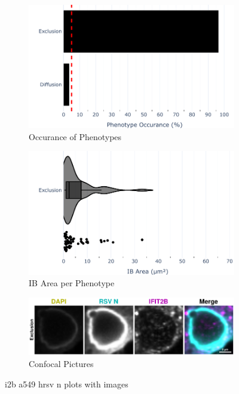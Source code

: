 \begin{figure}
    \begin{subfigure}{0.5\textwidth}
        \includegraphics[width=1\linewidth]{10. Chapter 5/Figs/01. Infection/02. IFIT2B/01. bar_i2b_a549-n.pdf} 
        \caption[]{Occurance of Phenotypes}
    \end{subfigure}
    \begin{subfigure}{0.5\textwidth}
        \includegraphics[width=1\linewidth]{10. Chapter 5/Figs/01. Infection/02. IFIT2B/02. violin_i2b_a549-n.pdf}
        \caption[]{IB Area per Phenotype}
    \end{subfigure}

    \begin{subfigure}{1\textwidth}
        \includegraphics[width=1\linewidth]{10. Chapter 5/Figs/01. Infection/02. IFIT2B/03. i2b a549 hrsv n.pdf} 
        \caption[]{Confocal Pictures}
    \end{subfigure}
    \caption[i2b a549 hrsv n plots with images]{i2b a549 hrsv n plots with images}
    \label{fig:i2b a549 hrsv n plots with images}
\end{figure}

